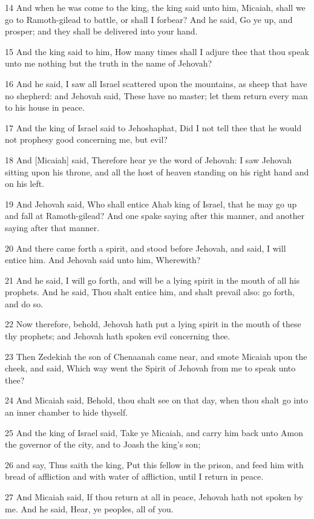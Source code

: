 \par 14 And when he was come to the king, the king said unto him, Micaiah, shall we go to Ramoth-gilead to battle, or shall I forbear? And he said, Go ye up, and prosper; and they shall be delivered into your hand.
\par 15 And the king said to him, How many times shall I adjure thee that thou speak unto me nothing but the truth in the name of Jehovah?
\par 16 And he said, I saw all Israel scattered upon the mountains, as sheep that have no shepherd: and Jehovah said, These have no master; let them return every man to his house in peace.
\par 17 And the king of Israel said to Jehoshaphat, Did I not tell thee that he would not prophesy good concerning me, but evil?
\par 18 And [Micaiah] said, Therefore hear ye the word of Jehovah: I saw Jehovah sitting upon his throne, and all the host of heaven standing on his right hand and on his left.
\par 19 And Jehovah said, Who shall entice Ahab king of Israel, that he may go up and fall at Ramoth-gilead? And one spake saying after this manner, and another saying after that manner.
\par 20 And there came forth a spirit, and stood before Jehovah, and said, I will entice him. And Jehovah said unto him, Wherewith?
\par 21 And he said, I will go forth, and will be a lying spirit in the mouth of all his prophets. And he said, Thou shalt entice him, and shalt prevail also: go forth, and do so.
\par 22 Now therefore, behold, Jehovah hath put a lying spirit in the mouth of these thy prophets; and Jehovah hath spoken evil concerning thee.
\par 23 Then Zedekiah the son of Chenaanah came near, and smote Micaiah upon the cheek, and said, Which way went the Spirit of Jehovah from me to speak unto thee?
\par 24 And Micaiah said, Behold, thou shalt see on that day, when thou shalt go into an inner chamber to hide thyself.
\par 25 And the king of Israel said, Take ye Micaiah, and carry him back unto Amon the governor of the city, and to Joash the king's son;
\par 26 and say, Thus saith the king, Put this fellow in the prison, and feed him with bread of affliction and with water of affliction, until I return in peace.
\par 27 And Micaiah said, If thou return at all in peace, Jehovah hath not spoken by me. And he said, Hear, ye peoples, all of you.
